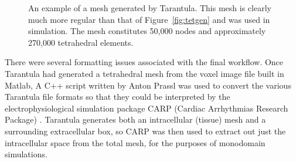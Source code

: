  \begin{figure}[htbp]
    \centering
    \caption{An example of a mesh generated by Tarantula. This mesh is clearly much more regular than that of Figure~\ref{fig:tetgen} and was used in simulation. The mesh constitutes 50,000 nodes and approximately 270,000 tetrahedral elements.}
    \label{fig:tarantula}
  \end{figure}
  
  There were several formatting issues associated with the final workflow. Once Tarantula had generated a tetrahedral mesh from the voxel image file built in Matlab, A C++ script written by Anton Prassl was used to convert the various Tarantula file formats so that they could be interpreted by the electrophysiological simulation package CARP (Cardiac Arrhythmias Research Package) \cite{Vigmond2003}. Tarantula generates both an intracellular (tissue) mesh and a surrounding extracellular box, so CARP was then used to extract out just the intracellular space from the total mesh, for the purposes of monodomain simulations.
  
